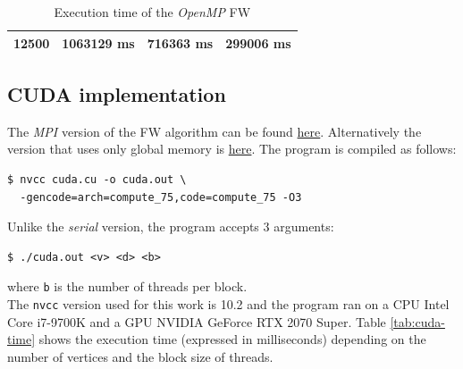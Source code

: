\begin{table}[h!]
\begin{tabular}{|r|r|r|r|}
12500                                                                                  & 1063129 ms                                                                                     & 716363 ms                                                                                       & 299006 ms                                                                                       \\ \hline
\end{tabular}
\caption{Execution time of the \emph{OpenMP} FW}                                                                                                                                            
\label{tab:omp-time}
\end{table}

\subsection{CUDA implementation}
The \emph{MPI} version of the FW algorithm can be found \href{https://github.com/firaja/Parallel-FloydWarshall/blob/master/cuda.cu}{here}. Alternatively the version 
that uses only global memory is \href{https://github.com/firaja/Parallel-FloydWarshall/blob/master/cuda2.cu}{here}.
The program is compiled as follows:
\begin{lstlisting}[basicstyle=\footnotesize\ttfamily]
$ nvcc cuda.cu -o cuda.out \
  -gencode=arch=compute_75,code=compute_75 -O3
\end{lstlisting}
Unlike the \emph{serial} version, the program accepts 3 arguments:
\begin{lstlisting}[basicstyle=\footnotesize\ttfamily]
$ ./cuda.out <v> <d> <b>
\end{lstlisting}
where \texttt{b} is the number of threads per block. \\
The \texttt{nvcc} version used for this work is 10.2 and the program ran on a CPU Intel Core i7-9700K and a GPU NVIDIA GeForce RTX 2070 Super.
Table \ref*{tab:cuda-time} shows the execution time (expressed in milliseconds) depending on the number of vertices and the block size of threads.

